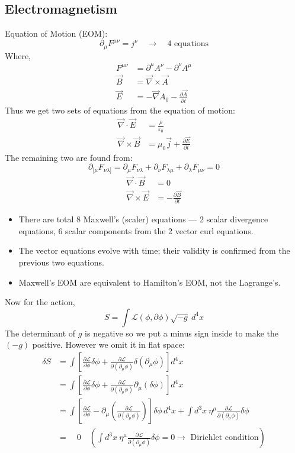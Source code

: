 \documentclass[14pt]{article} %
\begin{document}
\subsection{Electromagnetism}
Equation of Motion (EOM):
\[
\partial_\mu F^{\mu \nu} = j^\nu \quad \to \quad 4\text{ equations}
\]
Where,
\begin{align*}
F^{\mu \nu} &= \partial^\mu A^\nu - \partial^\nu A^\mu \\
\vec{B} &= \vec{\nabla} \times \vec{A} \\
\vec{E} &= -\vec{\nabla} A_0 - \frac{\partial \vec{A}}{\partial t}
\end{align*}
Thus we get two sets of equations from the equation of motion:
\begin{align*}
\vec{\nabla} \cdot \vec{E} &= \frac{\rho}{\varepsilon_0} \tag{M1} \\
\vec{\nabla} \times \vec{B} &= \mu_0 \vec{j} + \frac{\partial \vec{E}}{\partial t} \tag{M3}
\end{align*}
\newpage
The remaining two are found from:
\[
\partial_{[\mu}F_{\nu \lambda ]} = \partial_\mu F_{\nu \lambda} + \partial_\nu F_{\lambda \mu} + \partial_\lambda F_{\mu \nu} = 0 \tag*{[Bianchi identity]}
\]
\begin{align*}
\vec{\nabla} \cdot \vec{B} &= 0 \tag{M2} \\
\vec{\nabla} \times \vec{E} &= -\frac{\partial \vec{B}}{\partial t} \tag{M4}
\end{align*}
\begin{tcolorbox}[ title=Notes]
\begin{itemize}
    \item There are total 8 Maxwell’s (scaler) equations — 2 scalar divergence equations, 6 scalar components from the 2 vector curl equations.
    \item The vector equations evolve with time; their validity is confirmed from the previous two equations.
    \item Maxwell's EOM are equivalent to Hamilton's EOM, not the Lagrange's.
\end{itemize}
\end{tcolorbox}
Now for the action,
\[
S = \int \mathcal{L}(\phi, \partial \phi) \sqrt{-g}~ d^4x
\]
The determinant of $g$ is negative so we put a minus sign inside to make the $(-g)$ positive. However we omit it in flat space:
\begin{align*}
\delta S &= \int \left[ \frac{\partial \mathcal{L}}{\partial \phi} \delta \phi + \frac{\partial \mathcal{L}}{\partial(\partial_\mu \phi)} \delta(\partial_\mu \phi) \right] d^4x \\
&= \int \left[ \frac{\partial \mathcal{L}}{\partial \phi} \delta \phi + \frac{\partial \mathcal{L}}{\partial(\partial_\mu \phi)} \partial_\mu(\delta \phi) \right] d^4x \\
&= \int \left[ \frac{\partial \mathcal{L}}{\partial \phi} - \partial_\mu \left( \frac{\partial \mathcal{L}}{\partial(\partial_\mu \phi)} \right) \right] \delta \phi \, d^4x 
+ \int d^3x~\eta^\mu \frac{\partial \mathcal{L}}{\partial(\partial_\mu \phi)} \delta \phi \\
&= \quad0 \quad\left( \int d^3x~\eta^\mu \frac{\partial \mathcal{L}}{\partial(\partial_\mu \phi)} \delta \phi = 0 \to \text{ Dirichlet condition} \right)
\end{align*}
\end{document}
